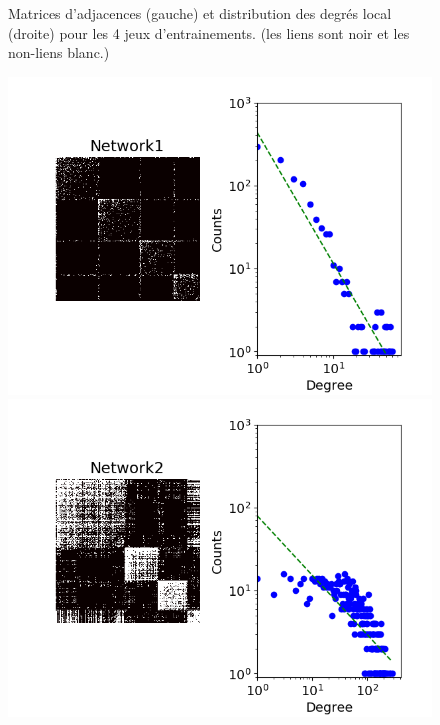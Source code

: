 \documentclass[french]{hermes-journal}
\begin{document}
\begin{figure}[h] {Matrices d'adjacences (gauche) et distribution des degrés local (droite) pour les 4 jeux d'entrainements. (les liens sont noir et les non-liens blanc.)}
        \begin{minipage}{0.4\textwidth}
            \includegraphics[width=1.1\textwidth]{img/corpus/network1_dd}
        \end{minipage}
        \begin{minipage}{0.4\textwidth}
            \includegraphics[width=1.1\textwidth]{img/corpus/network2_dd}
        \end{minipage}
        \begin{minipage}{0.4\textwidth}

\end{minipage}
\end{figure}
\end{document}
